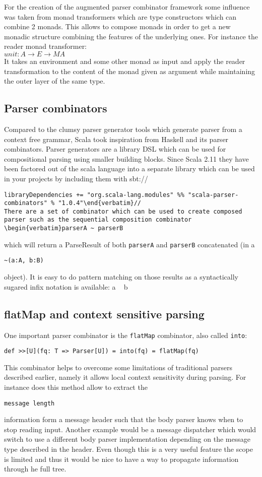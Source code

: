 For the creation of the augmented parser combinator framework some influence was taken from monad transformers which are type constructors which can combine 2 monads. This allows to compose monads in order to get a new monadic structure combining the features of the underlying ones. For instance the reader monad transformer:\\
$unit: A \rightarrow E \rightarrow M A $\\
It takes an environment and some other monad as input and apply the reader transformation to the content of the monad given as argument while maintaining the outer layer of the same type.  

\subsection{Parser combinators}
Compared to the clumsy parser generator tools which generate parser from a context free grammar, Scala took inspiration from Haskell and its parser combinators. Parser generators are a library DSL which can be used for compositional parsing using smaller building blocks.
Since Scala 2.11 they have been factored out of the scala language into a separate library which can be used in your projects by including them with sbt://
\begin{verbatim}libraryDependencies += "org.scala-lang.modules" %% "scala-parser-combinators" % "1.0.4"\end{verbatim}//
There are a set of combinator which can be used to create composed parser such as the sequential composition combinator \begin{verbatim}parserA ~ parserB\end{verbatim} which will return a ParseResult of both \verb/parserA/ and \verb/parserB/ concatenated (in a \begin{verbatim}~(a:A, b:B)\end{verbatim} object). It is easy to do pattern matching on those results as a syntactically sugared infix notation is available: a ~ b

\subsection{flatMap and context sensitive parsing}
One important parser combinator is the \verb/flatMap/ combinator, also called \verb/into/:
\begin{verbatim}def >>[U](fq: T => Parser[U]) = into(fq) = flatMap(fq)\end{verbatim}
This combinator helps to overcome some limitations of traditional parsers described earlier, namely it allows local context sensitivity during parsing. For instance does this method allow to extract the \begin{verbatim}message length\end{verbatim} information form a message header such that the body parser knows when to stop reading input. Another example would be a message dispatcher which would switch to use a different body parser implementation depending on the message type described in the header. Even though this is a very useful feature the scope is limited and thus it would be nice to have a way to propagate information through he full tree.
